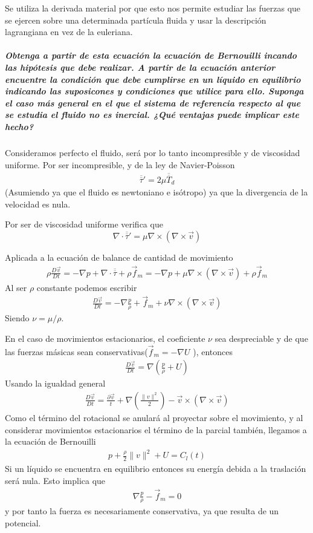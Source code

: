 \documentclass[a4paper]{article}
\begin{document}
Se utiliza la derivada material por que esto nos permite estudiar las
fuerzas que se ejercen sobre una determinada partícula fluida y usar
la descripción lagrangiana en vez de la euleriana.
\subparagraph{Obtenga a partir de esta ecuación la ecuación de Bernouilli
incando las hipótesis que debe realizar. A partir de la ecuación 
anterior encuentre la condición que debe cumplirse en un líquido
en equilibrio indicando las suposicones y condiciones que utilice
para ello. Suponga el caso más general en el que el sistema de 
referencia respecto al que se estudia el fluido no es inercial.
¿Qué ventajas puede implicar este hecho?} 

Consideramos perfecto el fluido, será por lo tanto incompresible
y de viscosidad uniforme.
Por ser incompresible, y de la ley de Navier-Poisson 
\begin{align*}
	\overline{\overline{\tau}}' = 2\mu \overline{\overline{T}}_d
\end{align*}
(Asumiendo ya que el fluido es newtoniano e isótropo) ya que la 
divergencia de la velocidad es nula.

Por ser de viscosidad uniforme verifica que 
$$\nabla \cdot \overline{\overline{\tau}}'= \mu \nabla \times (\nabla \times \vec{v}) $$

Aplicada a la ecuación de balance de cantidad de movimiento 
\begin{align*}
	\rho \frac{D \vec{v}}{Dt} = - \nabla p + \nabla \cdot \overline{\overline{\tau}} + \rho \vec{f}_m = -\nabla p + \mu \nabla \times (\nabla \times \vec{v})  + \rho \vec{f}_m
\end{align*}
Al ser $\rho$ constante podemos escribir 
\begin{align*}
	\frac{D \vec{v}}{Dt} = - \nabla \frac{p}{\rho }+ \vec{f}_m + \nu \nabla \times (\nabla \times \vec{v})  
\end{align*}
Siendo $\nu =  \mu / \rho$.

En el caso de movimientos estacionarios, el coeficiente $\nu$ sea 
despreciable y de que las fuerzas másicas sean conservativas($\vec{f}_m = - \nabla U$ ), entonces 
\begin{align*}
	\frac{D \vec{v}}{Dt}= \nabla \left(\frac{p}{\rho} + U\right)
\end{align*}
Usando la igualdad general 
\begin{align*}
	\frac{D \vec{v}}{D t} = \frac{\partial \vec{v}}{t} + \nabla \left( \frac{\| v\|^2}{2}\right) - \vec{v} \times (\nabla \times \vec{v})
\end{align*}
Como el término del rotacional se anulará al proyectar sobre el 
movimiento, y al considerar movimientos estacionarios el término
de la parcial también, llegamos a la ecuación de Bernouilli 
\begin{align*}
	p + \frac{\rho}{2} \| v \| ^2 + U = C_l (t)
\end{align*}
Si un líquido se encuentra en equilibrio entonces su energía
debida a la traslación será nula. Esto implica que 
\begin{align*}
\nabla \frac{p}{\rho} - \vec{f}_m = 0
\end{align*}
y por tanto la fuerza es necesariamente conservativa, ya que resulta
de un potencial.
\end{document}
